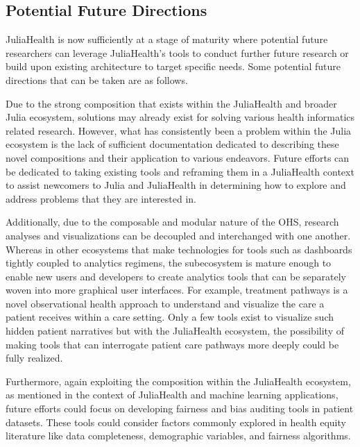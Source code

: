 \documentclass{juliacon}
\begin{document}
\subsection{Potential Future Directions}

JuliaHealth is now sufficiently at a stage of maturity where potential future researchers can leverage JuliaHealth's tools to conduct further future research or build upon existing architecture to target specific needs.
Some potential future directions that can be taken are as follows.

Due to the strong composition that exists within the JuliaHealth and broader Julia ecosystem, solutions may already exist for solving various health informatics related research.
However, what has consistently been a problem within the Julia ecosystem is the lack of sufficient documentation dedicated to describing these novel compositions and their application to various endeavors.
Future efforts can be dedicated to taking existing tools and reframing them in a JuliaHealth context to assist newcomers to Julia and JuliaHealth in determining how to explore and address problems that they are interested in.

Additionally, due to the composable and modular nature of the OHS, research analyses and visualizations can be decoupled and interchanged with one another.
Whereas in other ecosystems that make technologies for tools such as dashboards tightly coupled to analytics regimens, the subecosystem is mature enough to enable new users and developers to create analytics tools that can be separately woven into more graphical user interfaces.
For example, treatment pathways is a novel observational health approach to understand and visualize the care a patient receives within a care setting.
Only a few tools exist to visualize such hidden patient narratives but with the JuliaHealth ecosystem, the possibility of making tools that can interrogate patient care pathways more deeply could be fully realized.

Furthermore, again exploiting the composition within the JuliaHealth ecosystem, as mentioned in the context of JuliaHealth and machine learning applications, future efforts could focus on developing fairness and bias auditing tools in patient datasets.
These tools could consider factors commonly explored in health equity literature like data completeness, demographic variables, and fairness algorithms. 
\end{document}
